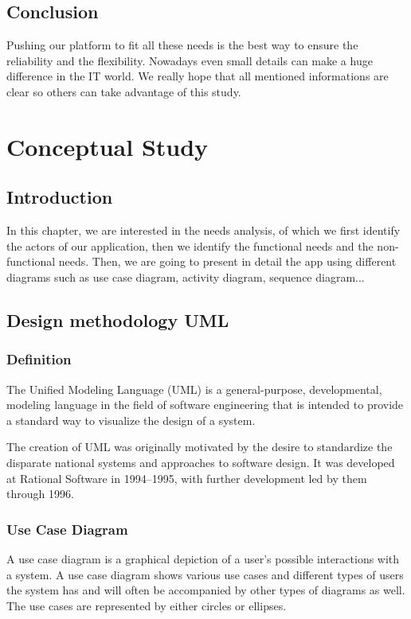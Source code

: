\documentclass[12pt]{report}
\begin{document}
\section*{Conclusion}
Pushing our platform to fit all these needs is the best way to ensure the reliability and the flexibility. Nowadays even small details can make a huge difference in the IT world.
We really hope that all mentioned informations are clear so others can take advantage of this study.
\chapter{Conceptual Study}
\renewcommand{\thesection}{\arabic{section}}
\section*{Introduction}
In this chapter, we are interested in the needs analysis, of which we first identify the actors of our application, then we identify the functional needs and the non-functional needs. Then, we are going to present in detail the app using different diagrams such as use case diagram, activity diagram, sequence diagram...

\setcounter{secnumdepth}{3}
\section{Design methodology UML}
\subsection*{Definition}
The Unified Modeling Language (UML) is a general-purpose, developmental, modeling language in the field of software engineering that is intended to provide a standard way to visualize the design of a system.\newline

The creation of UML was originally motivated by the desire to standardize the disparate national systems and approaches to software design. It was developed at Rational Software in 1994–1995, with further development led by them through 1996.
\subsection*{Use Case Diagram}
A use case diagram is a graphical depiction of a user's possible interactions with a system. A use case diagram shows various use cases and different types of users the system has and will often be accompanied by other types of diagrams as well. The use cases are represented by either circles or ellipses.
\end{document}
